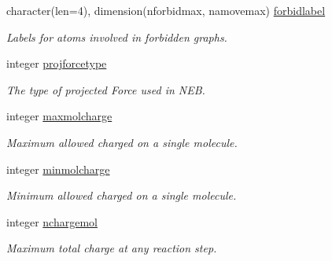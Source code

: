 \begin{DoxyCompactItemize}
\mbox{\label{namespaceglobaldata_aaa1c49351a28f6be1cb72d713c3736ca}} 
character(len=4), dimension(nforbidmax, namovemax) \mbox{\hyperlink{namespaceglobaldata_aaa1c49351a28f6be1cb72d713c3736ca}{forbidlabel}}
\begin{DoxyCompactList}\small\item\em Labels for atoms involved in forbidden graphs. \end{DoxyCompactList}\item 
\mbox{\label{namespaceglobaldata_adab5b9e51cfd76bf45c3ac2320082d04}} 
integer \mbox{\hyperlink{namespaceglobaldata_adab5b9e51cfd76bf45c3ac2320082d04}{projforcetype}}
\begin{DoxyCompactList}\small\item\em The type of projected Force used in N\+EB. \end{DoxyCompactList}\item 
\mbox{\label{namespaceglobaldata_a1e58bbcc4999b350fff0a75f000ca0c5}} 
integer \mbox{\hyperlink{namespaceglobaldata_a1e58bbcc4999b350fff0a75f000ca0c5}{maxmolcharge}}
\begin{DoxyCompactList}\small\item\em Maximum allowed charged on a single molecule. \end{DoxyCompactList}\item 
\mbox{\label{namespaceglobaldata_ac7166be9a05ce3735180aed94a9358e8}} 
integer \mbox{\hyperlink{namespaceglobaldata_ac7166be9a05ce3735180aed94a9358e8}{minmolcharge}}
\begin{DoxyCompactList}\small\item\em Minimum allowed charged on a single molecule. \end{DoxyCompactList}\item 
\mbox{\label{namespaceglobaldata_a98981105cf29a94cfd3e4d35ba32ab57}} 
integer \mbox{\hyperlink{namespaceglobaldata_a98981105cf29a94cfd3e4d35ba32ab57}{nchargemol}}
\begin{DoxyCompactList}\small\item\em Maximum total charge at any reaction step. \end{DoxyCompactList}\item 
\mbox{\label{namespaceglobaldata_ad30f540d6848058c4bfccdbf99be9fea}} 

\end{DoxyCompactItemize}

